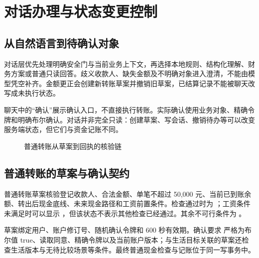 \sectionstart
\section{对话办理与状态变更控制}
\subsection{从自然语言到待确认对象}
对话层优先处理明确安全门与当前业务上下文，再选择本地规则、结构化理解、财务方案或普通只读回答。歧义收款人、缺失金额及不明确对象进入澄清，不能由模型凭空补齐。金额更正会创建新转账草案并撤销旧草案，已结算记录不能被聊天改写成未执行状态。

聊天中的“确认”展示确认入口，不直接执行转账。实际确认使用业务对象、精确令牌和明确布尔确认。对话并非完全只读：创建草案、写会话、撤销待办等可以改变服务端状态，但它们与资金记账不同。

\begin{figure}[htbp]\centering
\caption{普通转账从草案到回执的核验链}
\end{figure}

\subsection{普通转账的草案与确认契约}
普通转账草案核验登记收款人、合法金额、单笔不超过 50,000 元、当前已到账余额、转出后现金底线、未来现金路径和工资前置条件。检查通过时为 ；工资条件未满足时可以显示 ，但该状态不表示其他检查已经通过。其余不可行条件为 。

草案绑定用户、账户修订号、随机确认令牌和 600 秒有效期。确认要求  严格为布尔值 true、读取同意、精确令牌以及当前账户版本；与生活目标关联的草案还检查生活版本与无待比较场景等条件。最终普通现金检查与记账位于同一写事务中。


